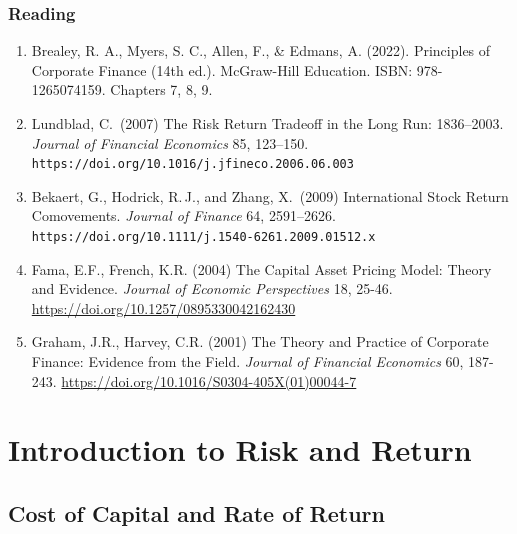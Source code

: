 \documentclass[9pt,aspectratio=169]{beamer}
\begin{document}
\begin{frame}
\frametitle{Reading}

\begin{enumerate}
  \item Brealey, R. A., Myers, S. C., Allen, F., \& Edmans, A. (2022). Principles of Corporate Finance (14th ed.). McGraw-Hill Education. ISBN: 978-1265074159. Chapters 7, 8, 9.

  \item Lundblad, C.\ (2007) The Risk Return Tradeoff in the Long Run: 1836--2003. 
        \emph{Journal of Financial Economics} 85, 123--150.\\
        \texttt{https://doi.org/10.1016/j.jfineco.2006.06.003}

  \item Bekaert, G., Hodrick, R.\,J., and Zhang, X.\ (2009) International Stock Return Comovements. 
        \emph{Journal of Finance} 64, 2591--2626.\\
        \texttt{https://doi.org/10.1111/j.1540-6261.2009.01512.x}


\item Fama, E.F., French, K.R. (2004) The Capital Asset Pricing Model: Theory and Evidence. \textit{Journal of Economic Perspectives} 18, 25-46.
\url{https://doi.org/10.1257/0895330042162430}


\item Graham, J.R., Harvey, C.R. (2001) The Theory and Practice of Corporate Finance: Evidence from the Field.  \textit{Journal of Financial Economics} 60, 187-243.
\url{https://doi.org/10.1016/S0304-405X(01)00044-7}
\end{enumerate}

\end{frame}


\section{Introduction to Risk and Return}




\subsection{Cost of Capital and Rate of Return}
\end{document}
